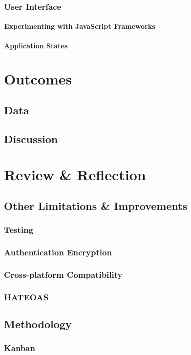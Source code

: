 \documentclass[]{report}
\begin{document}
			
			\subsection{User Interface}
				\subsubsection{Experimenting with JavaScript Frameworks}
				\subsubsection{Application States}
	\chapter{Outcomes}
		\section{Data}
		\section{Discussion}
	\chapter{Review \& Reflection}		
		\section{Other Limitations \& Improvements}
			\subsection{Testing}
			\subsection{Authentication Encryption}
			\subsection{Cross-platform Compatibility}
			\subsection{HATEOAS}
		\section{Methodology}
			\subsection{Kanban}
\end{document}
